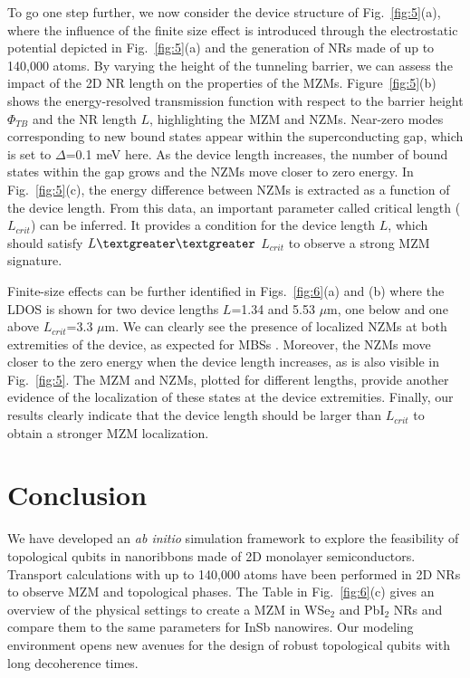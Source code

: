 \documentclass[10pt,usletter,conference]{IEEEtran}
\begin{document}
\par To go one step further, we now consider the device structure of
Fig.~\ref{fig:5}(a), where the influence of the finite size effect is
introduced through the electrostatic potential depicted in
Fig.~\ref{fig:5}(a) and the generation of NRs made of up to 140,000
atoms. By varying the height of the tunneling barrier, we can assess
the impact of the 2D NR length on the properties of the
MZMs. Figure~\ref{fig:5}(b) shows the energy-resolved transmission 
function with respect to the barrier height $\Phi_{TB}$ and the NR
length $L$, highlighting the MZM and NZMs. Near-zero modes
corresponding to new bound states appear within the superconducting
gap, which is set to $\Delta$=0.1 meV here. As the device length
increases, the number of bound states within the gap grows and the
NZMs move closer to zero energy. In Fig.~\ref{fig:5}(c), the energy
difference between NZMs is extracted as a function of the device
length. From this data, an important parameter called critical length
($L_{crit}$) can be inferred. It provides a condition for the device
length $L$, which should satisfy $L\textgreater\textgreater$ 
$L_{crit}$ to observe a strong MZM signature. 

\par Finite-size effects can be further identified in
Figs.~\ref{fig:6}(a) and (b) where the LDOS is shown for two device
lengths $L$=1.34 and 5.53 $\mu$m, one below and one above
$L_{crit}$=3.3 $\mu$m. We can clearly see the presence of
localized NZMs at both extremities of the device, as expected for MBSs 
\cite{MajoranaReview}. Moreover, the NZMs move closer to the zero
energy when the device length increases, as is also visible in
Fig.~\ref{fig:5}. The MZM and NZMs, plotted for different lengths,
provide another evidence of the localization of these states at the
device extremities. Finally, our results clearly indicate that the
device length should be larger than $L_{crit}$ to obtain a stronger
MZM localization.

\section{Conclusion}\label{sec:conc}
We have developed an \textit{ab initio} simulation framework to
explore the feasibility of topological qubits in nanoribbons made of
2D monolayer semiconductors. Transport calculations with up to
140,000 atoms have been performed in 2D NRs to observe MZM and
topological phases. The Table in Fig.~\ref{fig:6}(c) gives an overview
of the physical settings to create a MZM in WSe$_2$ and PbI$_2$ NRs
and compare them to the same parameters for InSb nanowires. Our
modeling environment opens new avenues for the design of robust
topological qubits with long decoherence times.
\end{document}
